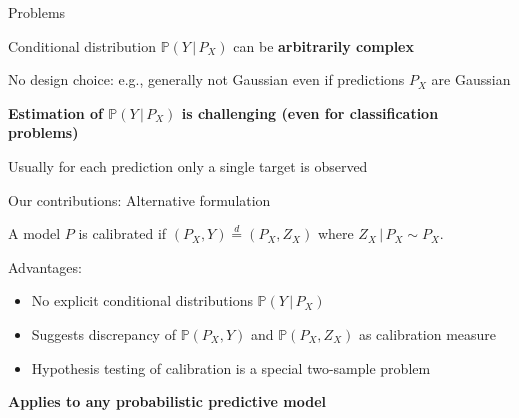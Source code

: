 \documentclass[aspectratio=169,hyperref={pdfpagelabels=false,pageanchor=false,bookmarks=false}]{beamer}
\newenvironment{uugreenbox}[1][]%
{\begin{tcolorbox}[colback=white,colframe=gronskastark,#1]}%
{\end{tcolorbox}}
\newenvironment{uubluebox}[1][]%
{\begin{tcolorbox}[colback=white,colframe=gryningstark,#1]}%
{\end{tcolorbox}}
\newcommand\hl[1]{\begingroup\bfseries\boldmath\color{uured}#1\endgroup}
\begin{document}
\begin{frame}{Problems}
  \begin{uugreenbox}[halign=flush center]
    Conditional distribution $\mathbb{P}(Y \,|\, P_X)$ can be \hl{arbitrarily complex}
  \end{uugreenbox}
  \begin{tcolorbox}[blankest, halign=flush center]
    No design choice: e.g., generally not Gaussian even if predictions $P_X$ are Gaussian
  \end{tcolorbox}

  \pause

  \vspace*{1.5\baselineskip}
  \begin{uugreenbox}[halign=flush center]
    \hl{Estimation} of $\mathbb{P}(Y \,|\, P_X)$ is \hl{challenging} (even for classification problems)
  \end{uugreenbox}
  \begin{tcolorbox}[blankest, halign=flush center]
    Usually for each prediction only a single target is observed
  \end{tcolorbox}
\end{frame}

\begin{frame}{Our contributions: Alternative formulation}
  \begin{uubluebox}[halign=flush center]
    A model $P$ is calibrated if $(P_X, Y) \stackrel{d}{=} (P_X, Z_X)$ where $Z_X \,|\, P_X \sim P_X$.
  \end{uubluebox}

  \pause

  Advantages:
  \begin{center}
    \vspace{-\topsep}
    \begin{itemize}
    \item No explicit conditional distributions $\mathbb{P}(Y \,|\, P_X)$
    \item Suggests discrepancy of $\mathbb{P}(P_X, Y)$ and $\mathbb{P}(P_X, Z_X)$
      as calibration measure
    \item Hypothesis testing of calibration is a special two-sample problem
    \end{itemize}
  \end{center}

  \pause
  \begin{center}
    \hl{Applies to any probabilistic predictive model}
  \end{center}
\end{frame}
\end{document}
